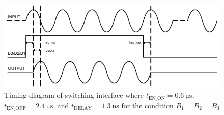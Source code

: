 \begin{figure}[htbp]
	\centering
	\includegraphics[width=.8\textwidth]{Figures/3_tx810_timing.pdf}
	\caption[Timing diagram of switching interface]{Timing diagram of switching interface where $t_{\mathrm{EN\_ON}}=\qty{0.6}{\micro\second}$, $t_{\mathrm{EN\_OFF}}=\qty{2.4}{\micro\second}$, and $t_{\mathrm{DELAY}}=\qty{1.3}{\nano\second}$ for the condition $B_1=B_2=B_3$ \cite{TX810}}
	\label{fig:3_tx810_timing}
\end{figure}

